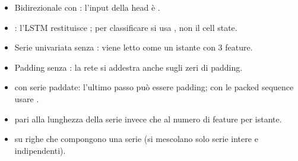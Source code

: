 \begin{attenzione}
\begin{itemize}
  \item Bidirezionale con : l'input della head è .
  \item {}: l'LSTM restituisce ; per classificare si usa , non il cell state.
  \item Serie univariata senza : \code{[1,2,3]} viene letto come un istante con 3 feature.
  \item Padding senza : la rete si addestra anche sugli zeri di padding.
  \item {} con serie paddate: l'ultimo passo può essere padding; con le packed sequence usare .
  \item {} pari alla lunghezza della serie invece che al numero di feature per istante.
  \item {} su righe che compongono una serie (si mescolano solo serie intere e indipendenti).
\end{itemize}
\end{attenzione}

